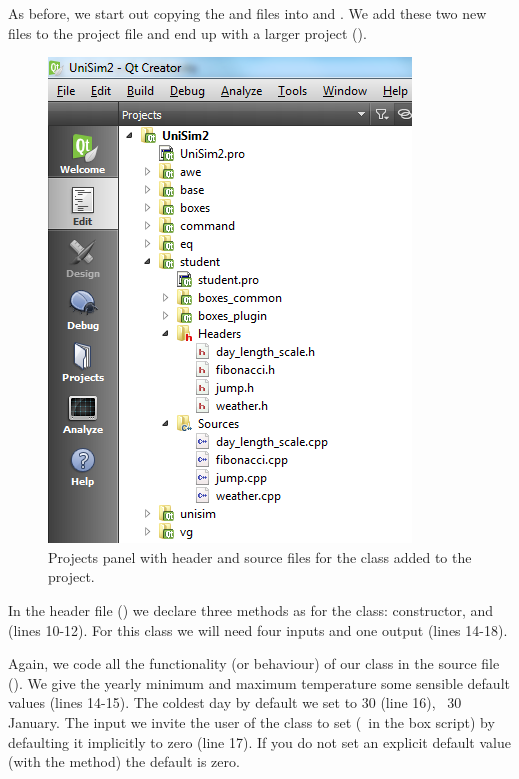 As before, we start out copying the  and  files into  and . We add these two new files to the  project file and end up with a larger project ().

\begin{figure}
\centering
\includegraphics[scale=0.7]{graphics/qt-creator-projects-student-3}
\caption{Projects panel with header and source files for the  class added to the  project.}
\label{fig:qt-creator-projects-student-3}
\end{figure}

In the header file () we declare three methods as for the  class: constructor,  and  (lines 10-12). For this class we will need four inputs and one output (lines 14-18).

Again, we code all the functionality (or behaviour) of our class in the source file (). We give the yearly minimum and maximum temperature some sensible default values (lines 14-15). The coldest day by default we set to 30 (line 16), \ie\ 30 January. The  input we invite the user of the class to set (\ie\ in the box script) by defaulting it implicitly to zero (line 17). If you do not set an explicit default value (with the  method) the default is zero. 


